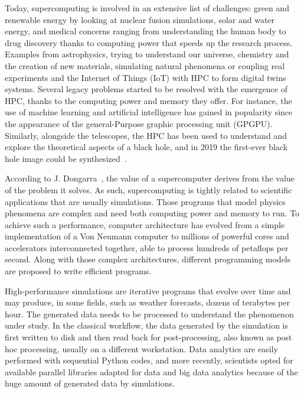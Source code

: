 Today, supercomputing is involved in an extensive list of challenges: green and renewable energy by looking at nuclear fusion simulations, solar and water energy, and medical concerns ranging from understanding the human body to drug discovery thanks to computing power that speeds up the research process. Examples from astrophysics, trying to understand our universe, chemistry and the creation of new materials, simulating natural phenomena or coupling real experiments and the Internet of Things (IoT) with HPC to form digital twins systems.
Several legacy problems started to be resolved with the emergence of HPC, thanks to the computing power and memory they offer. For instance, the use of machine learning and artificial intelligence has gained in popularity since the appearance of the general-Purpose graphic processing unit (GPGPU). Similarly, alongside the telescopes, the HPC has been used to understand and explore the theoretical aspects of a black hole, and in 2019 the first-ever black hole image could be synthesized~\cite{erotokritou_hpc_2019}.     

According to J. Dongarra~\cite{dongarra_trends_2006}, the value of a supercomputer derives from the value of the problem it solves. As such, supercomputing is tightly related to scientific applications that are usually simulations. Those programs that model physics phenomena are complex and need both computing power and memory to run. 
To achieve such a performance, computer architecture has evolved from a simple implementation of a Von Neumann computer to millions of powerful cores and accelerators interconnected together, able to process hundreds of petaflops per second. Along with those complex architectures, different programming models are proposed to write efficient programs.   

High-performance simulations are iterative programs that evolve over time and may produce, in some fields, such as weather forecasts, dozens of terabytes per hour.   
The generated data needs to be processed to understand the phenomenon under study. 
In the classical workflow, the data generated by the simulation is first written to disk and then read back for post-processing, also known as post hoc processing, usually on a different workstation. 
Data analytics are easily performed with sequential Python codes, and more recently, scientists opted for available parallel libraries adapted for data and big data analytics because of the huge amount of generated data by simulations. 

